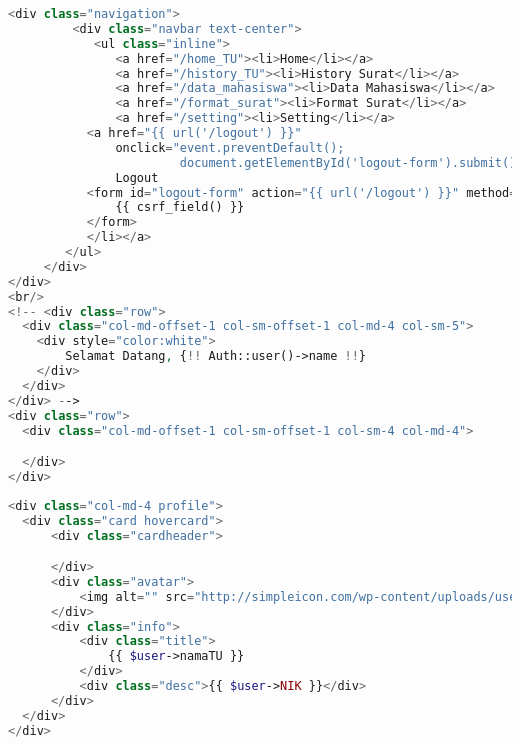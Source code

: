 \begin{lstlisting}[language=php,basicstyle=\tiny,caption=\textit{Navigation bar} untuk petugas TU]
	<div class="navigation">
         <div class="navbar text-center">
            <ul class="inline">
               <a href="/home_TU"><li>Home</li></a>
               <a href="/history_TU"><li>History Surat</li></a>
               <a href="/data_mahasiswa"><li>Data Mahasiswa</li></a>
               <a href="/format_surat"><li>Format Surat</li></a>
               <a href="/setting"><li>Setting</li></a>
           <a href="{{ url('/logout') }}"
               onclick="event.preventDefault();
                        document.getElementById('logout-form').submit();"><li>
               Logout
           <form id="logout-form" action="{{ url('/logout') }}" method="POST" style="display: none;">
               {{ csrf_field() }}
           </form>
           </li></a>
        </ul>
     </div>
</div>
<br/>
<!-- <div class="row">
  <div class="col-md-offset-1 col-sm-offset-1 col-md-4 col-sm-5">
    <div style="color:white">
        Selamat Datang, {!! Auth::user()->name !!}
    </div>
  </div>
</div> -->
<div class="row">
  <div class="col-md-offset-1 col-sm-offset-1 col-sm-4 col-md-4">

  </div>
</div>

\end{lstlisting}

\begin{lstlisting}[language=php,basicstyle=\tiny,caption=\textit{Sidebar} untuk petugas TU]
	<div class="col-md-4 profile">
  <div class="card hovercard">
      <div class="cardheader">

      </div>
      <div class="avatar">
          <img alt="" src="http://simpleicon.com/wp-content/uploads/user1.png">
      </div>
      <div class="info">
          <div class="title">
              {{ $user->namaTU }}
          </div>
          <div class="desc">{{ $user->NIK }}</div>
      </div>
  </div>
</div>

\end{lstlisting}